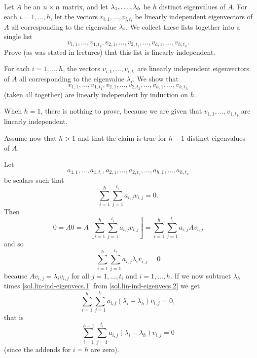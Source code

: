 \documentclass[a4paper]{amsart}
\renewenvironment{solution}{\SolutionInline}{\endSolutionInline}
\begin{document}
\begin{exercise}\label{ex-evectors-independent}
 Let $A$ be an $n\times n$ matrix, and let $\lambda_1,\dotsc,\lambda_h$ be $h$ distinct
 eigenvalues of $A$.   For each $i=1,\dotsc,h$, let the vectors
 $v_{i,1},\dotsc,v_{i,t_i}$ be linearly independent eigenvectors of
 $A$ all corresponding to the eigenvalue $\lambda_i$.  We collect these
 lists together into a single list 
 \[ v_{1,1},\dotsc,v_{1,t_1},
    v_{2,1},\dotsc,v_{2,t_2},\dotsc,
    v_{h,1},\dotsc,v_{h,t_h}.
 \]
 Prove (as was stated in lectures) that this list is linearly independent.
\end{exercise}
\begin{solution}
 For each $i = 1, \ldots, h$, the vectors $v_{i,1}, \ldots,
 v_{i,t_i}$ are linearly independent eigenvectors of $A$ all
 corresponding to the eigenvalue
 $\lambda_i$. We show that
 $$
 v_{1,1}, \ldots, v_{1,t_1},
 v_{2,1}, \ldots, v_{2,t_2},
 \ldots,
 v_{h,1}, \ldots, v_{h,t_h}
 $$
 (taken all together) are linearly independent by induction on $h$.

 When $h = 1$, there is nothing to prove, because we are given that
 $v_{1,1}, \ldots, v_{1,t_1}$ are linearly independent.

 Assume now that $h>1$ and that the claim is true for $h-1$
 distinct eigenvalues of $A$.

 Let
 $$
 a_{1,1}, \ldots, a_{1,t_1},
 a_{2,1}, \ldots, a_{2,t_2},
 \ldots,
 a_{h,1}, \ldots, a_{h,t_h}
 $$
 be scalars such that
 \begin{equation}
 \sum_{i=1}^h \sum_{j=1}^{t_i} a_{i,j}v_{i,j} = 0.
 \label{sol.lin-ind-eigenvecs.1}
 \end{equation}
 Then
 $$
 0 = A0 = A\left[\sum_{i=1}^h \sum_{j=1}^{t_i} a_{i,j}v_{i,j}\right]
 = \sum_{i=1}^h \sum_{j=1}^{t_i} a_{i,j}Av_{i,j}$$
 and so
 \begin{equation}
 \sum_{i=1}^h \sum_{j=1}^{t_i} a_{i,j}\lambda_iv_{i,j} = 0
 \label{sol.lin-ind-eigenvecs.2}
 \end{equation}
 because $Av_{i,j} = \lambda_iv_{i,j}$ for all $j = 1, \ldots, t_i$ and
 $i = 1, \ldots, h$. If we
 now subtract $\lambda_h$ times \eqref{sol.lin-ind-eigenvecs.1} from
 \eqref{sol.lin-ind-eigenvecs.2} we get
 $$
 \sum_{i=1}^h \sum_{j=1}^{t_i} a_{i,j}(\lambda_i - \lambda_h)v_{i,j} = 0,
 $$
 that is
 $$
 \sum_{i=1}^{h-1} \sum_{j=1}^{t_i} a_{i,j}(\lambda_i - \lambda_h)v_{i,j} = 0
 $$
 (since the addends for $i=h$ are zero).


\end{solution}
\end{document}
